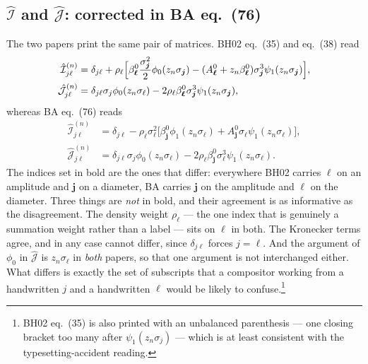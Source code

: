 \documentclass[11pt,a4paper]{article}
\newcommand{\eqBH}[1]{eq.~(#1)}
\begin{document}
\subsection{$\hat{\mathcal I}$ and $\hat{\mathcal J}$: corrected in BA \eqBH{76}}

The two papers print the same pair of matrices. BH02 \eqBH{35} and \eqBH{38}
read
\begin{align}
  \hat{\mathcal I}^{(n)}_{j\ell}&=\delta_{j\ell}+\rho_\ell\Bigl[
    \beta^0_{\boldsymbol\ell}\frac{\sigma_{\boldsymbol j}^2}{2}
      \phi_0(z_n\sigma_{\boldsymbol j})
    -(A^0_{\boldsymbol\ell}+z_n\beta^0_{\boldsymbol\ell})
      \sigma_{\boldsymbol j}^3\psi_1(z_n\sigma_{\boldsymbol j})\Bigr],
  \label{eq:bh35}\\
  \hat{\mathcal J}^{(n)}_{j\ell}&=\delta_{j\ell}\sigma_j\phi_0(z_n\sigma_\ell)
    -2\rho_\ell\beta^0_{\boldsymbol\ell}\sigma_{\boldsymbol j}^3
      \psi_1(z_n\sigma_{\boldsymbol j}),
  \label{eq:bh38}
\end{align}
whereas BA \eqBH{76} reads
\begin{align}
  \hat{\mathcal I}^{(n)}_{j\ell}&=\delta_{j\ell}
    -\rho_\ell\sigma_{\boldsymbol\ell}^2\bigl[
      \beta^0_{\boldsymbol j}\phi_1(z_n\sigma_{\boldsymbol\ell})
      +A^0_{\boldsymbol j}\sigma_{\boldsymbol\ell}
        \psi_1(z_n\sigma_{\boldsymbol\ell})\bigr],
  \label{eq:ba76a}\\
  \hat{\mathcal J}^{(n)}_{j\ell}&=\delta_{j\ell}\sigma_j\phi_0(z_n\sigma_\ell)
    -2\rho_\ell\beta^0_{\boldsymbol j}\sigma_{\boldsymbol\ell}^3
      \psi_1(z_n\sigma_{\boldsymbol\ell}).
  \label{eq:ba76b}
\end{align}
The indices set in bold are the ones that differ: everywhere BH02 carries
$\boldsymbol\ell$ on an amplitude and $\boldsymbol j$ on a diameter, BA carries
$\boldsymbol j$ on the amplitude and $\boldsymbol\ell$ on the diameter. Three
things are \emph{not} in bold, and their agreement is as informative as the
disagreement. The density weight $\rho_\ell$ --- the one index that is
genuinely a summation weight rather than a label --- sits on $\ell$ in both.
The Kronecker terms agree, and in any case cannot differ, since $\delta_{j\ell}$
forces $j=\ell$. And the argument of $\phi_0$ in $\hat{\mathcal J}$ is
$z_n\sigma_\ell$ in \emph{both} papers, so that one argument is not
interchanged either. What differs is exactly the set of subscripts that a
compositor working from a handwritten $j$ and a handwritten $\ell$ would be
likely to confuse.\footnote{BH02 \eqBH{35} is also printed with an unbalanced
parenthesis --- one closing bracket too many after
$\psi_1(z_n\sigma_j)$ --- which is at least consistent with the
typesetting-accident reading.}
\end{document}
